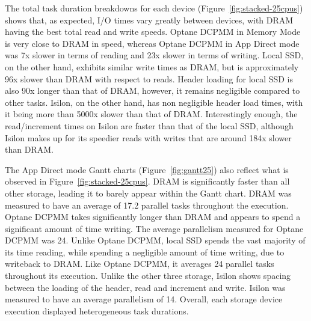 \documentclass[conference]{IEEEtran}
\begin{document}
The total task duration breakdowns for each device (Figure~\ref{fig:stacked-25cpus})
shows that, as expected, I/O times vary greatly between devices, with DRAM having the
best total read and write speeds. Optane DCPMM in Memory Mode is very close to DRAM in speed,
whereas Optane DCPMM in App Direct mode was 7x slower in terms of reading and 23x slower in terms
of writing. Local SSD, on the other hand, exhibits similar write times as DRAM, but is
approximately 96x slower than DRAM with respect to reads. Header loading for local SSD is also 90x longer
than that of DRAM, however, it remains negligible compared to other tasks. Isilon, on the 
other hand, has non negligible header load times, with it being more than 5000x
slower than that of DRAM. Interestingly enough, the read/increment times on Isilon are
faster than that of the local SSD, although Isilon makes up for its speedier reads with 
writes that are around 184x slower than DRAM.


The App Direct mode Gantt charts (Figure~\ref{fig:gantt25}) also reflect what is observed in Figure~\ref{fig:stacked-25cpus}.
DRAM is significantly faster than all other storage, leading it to barely appear within the Gantt chart.
DRAM was measured to have an average of 17.2 parallel tasks throughout the execution. Optane DCPMM takes
significantly longer than DRAM and appears to spend a significant amount of time writing. The average
parallelism measured for Optane DCPMM was 24. Unlike Optane DCPMM, local SSD spends the vast majority of its time
reading, while spending a negligible amount of time writing, due to writeback to DRAM. Like Optane DCPMM, it averages 24 parallel tasks
throughout its execution. Unlike the other three storage, Isilon shows spacing between the loading of the header,
read and increment and write. Isilon was measured to have an average parallelism of 14. Overall, each storage device
execution displayed heterogeneous task durations.
\end{document}

